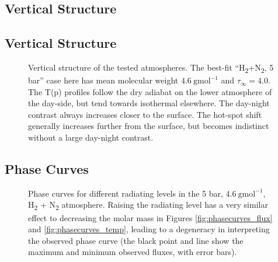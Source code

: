 \subsection{Vertical Structure}


\subsection{Vertical Structure}\label{sec:vertical_structure}
\begin{figure}
\caption{Vertical structure of the tested atmospheres. The best-fit ``H\textsubscript{2}+N\textsubscript{2}, 5 bar'' case here has mean molecular weight $4.6\ \mathrm{gmol}^{-1}$ and $\tau_{\infty} = 4.0$. The T(p) profiles follow the dry adiabat on the lower atmosphere of the day-side, but tend towards isothermal elsewhere. The day-night contrast always increases closer to the surface. The hot-spot shift generally increases further from the surface, but becomes indistinct without a large day-night contrast. \label{fig:pressure_variation}}
\end{figure}

\subsection{Phase Curves}

\begin{figure}
\caption{Phase curves for different radiating levels in the 5 bar, $4.6\ \mathrm{gmol}^{-1}$,  H\textsubscript{2} + N\textsubscript{2} atmosphere. Raising the radiating level has a very similar effect to decreasing the molar mass in Figures \ref{fig:phasecurves_flux} and \ref{fig:phasecurves_temp}, leading to a degeneracy in interpreting the observed phase curve (the black point and line show the maximum and minimum observed fluxes, with error bars).\label{fig:phasecurves}}
\end{figure}

